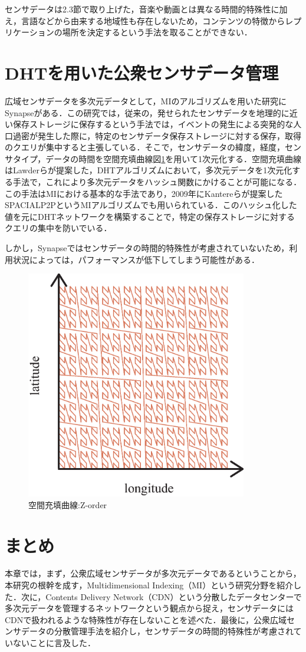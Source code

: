 センサデータは2.3節で取り上げた，音楽や動画とは異なる時間的特殊性に加え，言語などから由来する地域性も存在しないため，コンテンツの特徴からレプリケーションの場所を決定するという手法を取ることができない．

\section{DHTを用いた公衆センサデータ管理}
広域センサデータを多次元データとして，MIのアルゴリズムを用いた研究にSynapse\cite{Terayama:2012:DSD:2370216.2370335}がある．この研究では，従来の，発せられたセンサデータを地理的に近い保存ストレージに保存するという手法では，イベントの発生による突発的な人口過密が発生した際に，特定のセンサデータ保存ストレージに対する保存，取得のクエリが集中すると主張している．そこで，センサデータの緯度，経度，センサタイプ，データの時間を空間充填曲線\cite{Lawder:2000:USC:646102.681186}図\ref{fig:zorder}を用いて1次元化する．空間充填曲線はLawderらが提案した，DHTアルゴリズムにおいて，多次元データを1次元化する手法で，これにより多次元データをハッシュ関数にかけることが可能になる．この手法はMIにおける基本的な手法であり，2009年にKantereらが提案したSPACIALP2P\cite{Kantere:2009:SIS:1495799.1496017}というMIアルゴリズムでも用いられている．このハッシュ化した値を元にDHTネットワークを構築することで，特定の保存ストレージに対するクエリの集中を防いでいる．

しかし，Synapseではセンサデータの時間的特殊性が考慮されていないため，利用状況によっては，パフォーマンスが低下してしまう可能性がある．
\begin{figure}[htbp]
 \begin{center}
  \includegraphics[height=100mm]{./images/zorder.eps}
 \end{center}
 \caption{空間充填曲線:Z-order}
 \label{fig:zorder}
\end{figure}
\section{まとめ}
本章では，まず，公衆広域センサデータが多次元データであるということから，本研究の根幹を成す，Multidimensional Indexing（MI）という研究分野を紹介した．次に，Contents Delivery Network（CDN）という分散したデータセンターで多次元データを管理するネットワークという観点から捉え，センサデータにはCDNで扱われるような特殊性が存在しないことを述べた．最後に，公衆広域センサデータの分散管理手法を紹介し，センサデータの時間的特殊性が考慮されていないことに言及した．